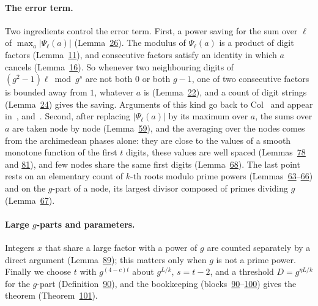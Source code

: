 \documentclass[11pt]{article}
\theoremstyle{definition}\newtheorem{hffdef}[hffc]{Definition}
\theoremstyle{plain}\newtheorem{hfflem}[hffc]{Lemma}\newtheorem{hffthm}[hffc]{Theorem}
\theoremstyle{remark}\newtheorem{hffrem}[hffc]{Remark}
\begin{document}
\paragraph{The error term.} Two ingredients control the error term. First, a power saving for the sum over $\ell$ of $\max_a|\Psi_\ell(a)|$ (Lemma~\hyperref[L:saving]{26}). The modulus of $\Psi_\ell(a)$ is a product of digit factors (Lemma~\hyperref[L:prod]{11}), and consecutive factors satisfy an identity in which $a$ cancels (Lemma~\hyperref[L:ident]{16}). So whenever two neighbouring digits of $(g^2-1)\ell\bmod g^s$ are not both $0$ or both $g-1$, one of two consecutive factors is bounded away from $1$, whatever $a$ is (Lemma~\hyperref[L:badprod]{22}), and a count of digit strings (Lemma~\hyperref[L:strings]{24}) gives the saving. Arguments of this kind go back to Col~\cite{Col} and appear in~\cite{TP}, \cite{DMRSS} and~\cite{BhS}. Second, after replacing $|\Psi_\ell(a)|$ by its maximum over $a$, the sums over $a$ are taken node by node (Lemma~\hyperref[L:asum]{59}), and the averaging over the nodes comes from the archimedean phases alone: they are close to the values of a smooth monotone function of the first $t$ digits, these values are well spaced (Lemmas~\hyperref[L:gaps]{78} and \hyperref[L:space]{81}), and few nodes share the same first digits (Lemma~\hyperref[L:fibre]{68}). The last point rests on an elementary count of $k$-th roots modulo prime powers (Lemmas~\hyperref[L:binom]{63}--\hyperref[L:rootsn]{66}) and on the $g$-part of a node, its largest divisor composed of primes dividing $g$ (Lemma~\hyperref[L:rigid]{67}).

\paragraph{Large $g$-parts and parameters.} Integers $x$ that share a large factor with a power of $g$ are counted separately by a direct argument (Lemma~\hyperref[L:largeg]{89}); this matters only when $g$ is not a prime power. Finally we choose $t$ with $g^{(4-c)t}$ about $g^{L/k}$, $s=t-2$, and a threshold $D=g^{\eta L/k}$ for the $g$-part (Definition~\hyperref[D:par]{90}), and the bookkeeping (blocks~\hyperref[D:par]{90}--\hyperref[L:final]{100}) gives the theorem (Theorem~\hyperref[T:main]{101}).
\end{document}
